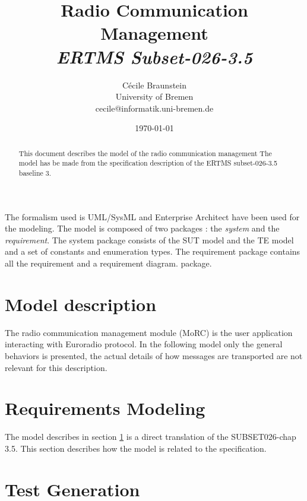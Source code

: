 \documentclass[11pt,notitlepage]{article}
\title{Radio Communication Management \\
    {\it ERTMS Subset-026-3.5}}
\author{C{\'e}cile Braunstein\\University of Bremen\\
cecile@informatik.uni-bremen.de}
\date{\today}                                           %
\begin{document}
\maketitle

\begin{abstract}
This document describes the model of the radio communication management The
model has be made from the specification description of the ERTMS subset-026-3.5
baseline 3.
\end{abstract}
The formalism used is UML/SysML \cite{SysML} and Enterprise Architect \cite{EA} have been
used for the modeling.
The model is composed of two packages : the \emph{system} and the
\emph{requirement}. The system package consists of the SUT model and the TE
model and a set of constants and enumeration types. The
requirement package contains all the requirement and a requirement diagram.
package.

\section{Model description}
\label{sec:modeldescription}
The radio communication management module (MoRC) is the user application interacting
with Euroradio protocol. In the following model only the general behaviors is
presented, the actual details of how messages are transported are not relevant
for this description.

\section{Requirements Modeling}
\label{sec:requirements}
The model describes in section \ref{sec:modeldescription} is a direct
translation of the SUBSET026-chap 3.5. This section describes how the model is
related to the specification.

\section{Test Generation}
\label{sec:tests}

%


\end{document}

